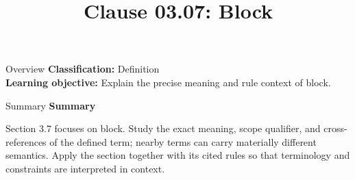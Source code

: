 \documentclass[10pt,letterpaper]{article}
\title{Clause 03.07: Block}
\author{}
\date{}
\begin{document}
\maketitle
\begin{CornellOverviewBox}{Overview}
\textbf{Classification:} Definition\\[2pt]
\textbf{Learning objective:} Explain the precise meaning and rule context of block.
\end{CornellOverviewBox}\begin{CornellSummaryBox}{Summary}
{\sffamily\bfseries\color{Accent} Summary}\par\vspace{3pt}Section 3.7 focuses on block. Study the exact meaning, scope qualifier, and cross-references of the defined term; nearby terms can carry materially different semantics. Apply the section together with its cited rules so that terminology and constraints are interpreted in context.
\end{CornellSummaryBox}
\end{document}
